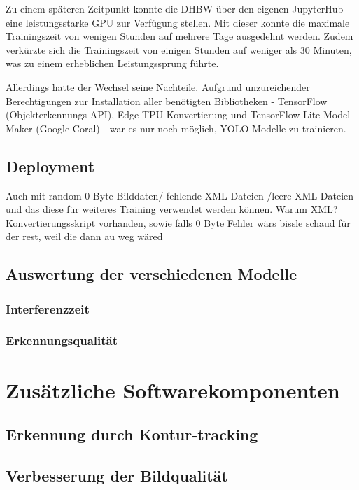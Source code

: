Zu einem späteren Zeitpunkt konnte die DHBW über den eigenen JupyterHub eine leistungsstarke GPU zur Verfügung stellen. Mit dieser konnte die maximale Trainingszeit von wenigen Stunden auf mehrere Tage ausgedehnt werden. Zudem verkürzte sich die Trainingszeit von einigen Stunden auf weniger als 30 Minuten, was zu einem erheblichen Leistungssprung führte.

Allerdings hatte der Wechsel seine Nachteile. Aufgrund unzureichender Berechtigungen zur Installation aller benötigten Bibliotheken - TensorFlow (Objekterkennungs-API), Edge-TPU-Konvertierung und TensorFlow-Lite Model Maker (Google Coral) - war es nur noch möglich, \ac{YOLO}-Modelle zu trainieren.

\subsection{Deployment}

Auch mit random 0 Byte Bilddaten/ fehlende XML-Dateien /leere XML-Dateien und das diese für weiteres Training verwendet werden können. Warum XML? Konvertierungsskript vorhanden, sowie falls 0 Byte Fehler wärs bissle schaud für der rest, weil die dann au weg wäred

\subsection{Auswertung der verschiedenen Modelle} \label{cap:Benchmarks}



\subsubsection{Interferenzzeit}

\subsubsection{Erkennungsqualität}

\section{Zusätzliche Softwarekomponenten}

\subsection{Erkennung durch Kontur-tracking}

\subsection{Verbesserung der Bildqualität}

